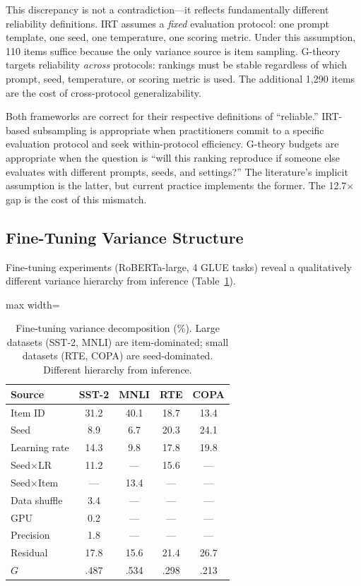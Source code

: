 \documentclass[11pt,twocolumn]{article}
\newcommand{\Gcoeff}{\ensuremath{G}}
\newcommand{\pct}{\%}
\begin{document}
This discrepancy is not a contradiction---it reflects fundamentally different reliability definitions. IRT assumes a \emph{fixed} evaluation protocol: one prompt template, one seed, one temperature, one scoring metric. Under this assumption, 110 items suffice because the only variance source is item sampling. G-theory targets reliability \emph{across} protocols: rankings must be stable regardless of which prompt, seed, temperature, or scoring metric is used. The additional 1{,}290 items are the cost of cross-protocol generalizability.

Both frameworks are correct for their respective definitions of ``reliable.'' IRT-based subsampling is appropriate when practitioners commit to a specific evaluation protocol and seek within-protocol efficiency. G-theory budgets are appropriate when the question is ``will this ranking reproduce if someone else evaluates with different prompts, seeds, and settings?'' The literature's implicit assumption is the latter, but current practice implements the former. The 12.7$\times$ gap is the cost of this mismatch.

\subsection{Fine-Tuning Variance Structure}
\label{sec:finetuning}

Fine-tuning experiments (RoBERTa-large, 4 GLUE tasks) reveal a qualitatively different variance hierarchy from inference (Table~\ref{tab:finetuning}).

\begin{table}[t]
\centering
\caption{Fine-tuning variance decomposition (\pct{}). Large datasets (SST-2, MNLI) are item-dominated; small datasets (RTE, COPA) are seed-dominated. Different hierarchy from inference.}
\label{tab:finetuning}
\small
\begin{adjustbox}{max width=\columnwidth}
\begin{tabular}{@{}lcccc@{}}
\toprule
\textbf{Source} & \textbf{SST-2} & \textbf{MNLI} & \textbf{RTE} & \textbf{COPA} \\
\midrule
Item ID      & 31.2 & 40.1 & 18.7 & 13.4 \\
Seed         &  8.9 &  6.7 & 20.3 & 24.1 \\
Learning rate & 14.3 &  9.8 & 17.8 & 19.8 \\
Seed$\times$LR & 11.2 &  --- & 15.6 &  --- \\
Seed$\times$Item & --- & 13.4 &  --- &  --- \\
Data shuffle &  3.4 &  --- &  --- &  --- \\
GPU          &  0.2 &  --- &  --- &  --- \\
Precision    &  1.8 &  --- &  --- &  --- \\
Residual     & 17.8 & 15.6 & 21.4 & 26.7 \\
\midrule
$\Gcoeff$    & .487 & .534 & .298 & .213 \\
\bottomrule
\end{tabular}
\end{adjustbox}
\vspace{-2mm}
\end{table}
\end{document}
